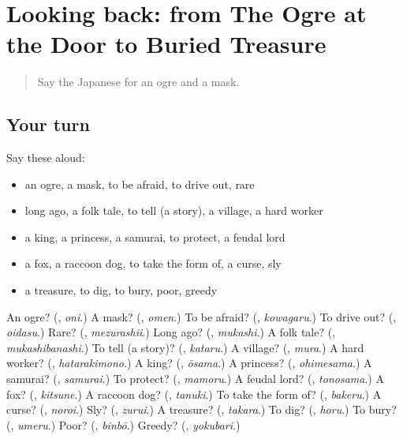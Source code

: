 \section[(dialogue)]{Looking back: from The Ogre at the Door to Buried Treasure}

\label{lesson:JA-R301-review-297-301}



\begin{quote}
Say the Japanese for an ogre and a mask.
\end{quote}

\subsection*{Your turn}
Say these aloud:

\begin{itemize}
\raggedright
  \item an ogre, a mask, to be afraid, to drive out, rare
  \item long ago, a folk tale, to tell (a story), a village, a hard worker
  \item a king, a princess, a samurai, to protect, a feudal lord
  \item a fox, a raccoon dog, to take the form of, a curse, sly
  \item a treasure, to dig, to bury, poor, greedy
\end{itemize}

\begin{tcolorbox}[breakable,colback=teal!4,colframe=teal!35!black,title={Before you move on}]
An ogre? (\textbf{}, \emph{oni}.) A mask? (\textbf{}, \emph{omen}.) To be afraid? (\textbf{}, \emph{kowagaru}.) To drive out? (\textbf{}, \emph{oidasu}.) Rare? (\textbf{}, \emph{mezurashii}.) Long ago? (\textbf{}, \emph{mukashi}.) A folk tale? (\textbf{}, \emph{mukashibanashi}.) To tell (a story)? (\textbf{}, \emph{kataru}.) A village? (\textbf{}, \emph{mura}.) A hard worker? (\textbf{}, \emph{hatarakimono}.) A king? (\textbf{}, \emph{ōsama}.) A princess? (\textbf{}, \emph{ohimesama}.) A samurai? (\textbf{}, \emph{samurai}.) To protect? (\textbf{}, \emph{mamoru}.) A feudal lord? (\textbf{}, \emph{tonosama}.) A fox? (\textbf{}, \emph{kitsune}.) A raccoon dog? (\textbf{}, \emph{tanuki}.) To take the form of? (\textbf{}, \emph{bakeru}.) A curse? (\textbf{}, \emph{noroi}.) Sly? (\textbf{}, \emph{zurui}.) A treasure? (\textbf{}, \emph{takara}.) To dig? (\textbf{}, \emph{horu}.) To bury? (\textbf{}, \emph{umeru}.) Poor? (\textbf{}, \emph{binbō}.) Greedy? (\textbf{}, \emph{yokubari}.)
\end{tcolorbox}
